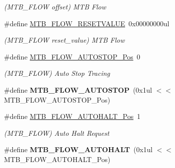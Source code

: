 \begin{DoxyCompactItemize}
\begin{DoxyCompactList}\small\item\em (M\+T\+B\+\_\+\+F\+L\+O\+W offset) M\+T\+B Flow \end{DoxyCompactList}\item 
\hypertarget{group___s_a_m_l21___m_t_b_ga409fc345c6a2fa1d9b5979473041ddb9}{}\#define \hyperlink{group___s_a_m_l21___m_t_b_ga409fc345c6a2fa1d9b5979473041ddb9}{M\+T\+B\+\_\+\+F\+L\+O\+W\+\_\+\+R\+E\+S\+E\+T\+V\+A\+L\+U\+E}~0x00000000ul\label{group___s_a_m_l21___m_t_b_ga409fc345c6a2fa1d9b5979473041ddb9}

\begin{DoxyCompactList}\small\item\em (M\+T\+B\+\_\+\+F\+L\+O\+W reset\+\_\+value) M\+T\+B Flow \end{DoxyCompactList}\item 
\hypertarget{group___s_a_m_l21___m_t_b_gac3124ae07b05d0b5b3705e930a6b95c0}{}\#define \hyperlink{group___s_a_m_l21___m_t_b_gac3124ae07b05d0b5b3705e930a6b95c0}{M\+T\+B\+\_\+\+F\+L\+O\+W\+\_\+\+A\+U\+T\+O\+S\+T\+O\+P\+\_\+\+Pos}~0\label{group___s_a_m_l21___m_t_b_gac3124ae07b05d0b5b3705e930a6b95c0}

\begin{DoxyCompactList}\small\item\em (M\+T\+B\+\_\+\+F\+L\+O\+W) Auto Stop Tracing \end{DoxyCompactList}\item 
\hypertarget{group___s_a_m_l21___m_t_b_ga46cc1df575220a9779a4a967e8e5a7e0}{}\#define {\bfseries M\+T\+B\+\_\+\+F\+L\+O\+W\+\_\+\+A\+U\+T\+O\+S\+T\+O\+P}~(0x1ul $<$$<$ M\+T\+B\+\_\+\+F\+L\+O\+W\+\_\+\+A\+U\+T\+O\+S\+T\+O\+P\+\_\+\+Pos)\label{group___s_a_m_l21___m_t_b_ga46cc1df575220a9779a4a967e8e5a7e0}

\item 
\hypertarget{group___s_a_m_l21___m_t_b_gac5491bf0138a340d2c227f2761af6fcb}{}\#define \hyperlink{group___s_a_m_l21___m_t_b_gac5491bf0138a340d2c227f2761af6fcb}{M\+T\+B\+\_\+\+F\+L\+O\+W\+\_\+\+A\+U\+T\+O\+H\+A\+L\+T\+\_\+\+Pos}~1\label{group___s_a_m_l21___m_t_b_gac5491bf0138a340d2c227f2761af6fcb}

\begin{DoxyCompactList}\small\item\em (M\+T\+B\+\_\+\+F\+L\+O\+W) Auto Halt Request \end{DoxyCompactList}\item 
\hypertarget{group___s_a_m_l21___m_t_b_ga037061e2773e10666bf6caf6f5797ae7}{}\#define {\bfseries M\+T\+B\+\_\+\+F\+L\+O\+W\+\_\+\+A\+U\+T\+O\+H\+A\+L\+T}~(0x1ul $<$$<$ M\+T\+B\+\_\+\+F\+L\+O\+W\+\_\+\+A\+U\+T\+O\+H\+A\+L\+T\+\_\+\+Pos)\label{group___s_a_m_l21___m_t_b_ga037061e2773e10666bf6caf6f5797ae7}


\end{DoxyCompactItemize}
